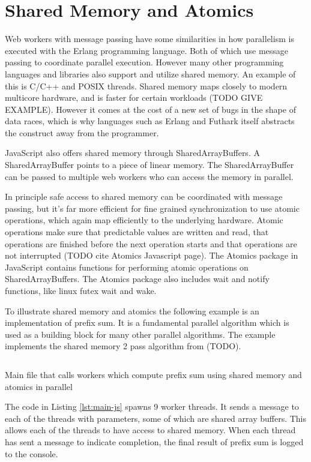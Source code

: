 \documentclass[11pt]{book}
\begin{document}
\section{Shared Memory and Atomics}

Web workers with message passing have some similarities in how parallelism is executed with the Erlang programming language. Both of which use message passing to coordinate parallel execution. However many other programming languages and libraries also support and utilize shared memory. An example of this is C/C++ and POSIX threads. Shared memory maps closely to modern multicore hardware, and is faster for certain workloads (TODO GIVE EXAMPLE). However it comes at the cost of a new set of bugs in the shape of data races, which is why languages such as Erlang and Futhark itself abstracts the construct away from the programmer.

JavaScript also offers shared memory through SharedArrayBuffers. A SharedArrayBuffer points to a piece of linear memory. The SharedArrayBuffer can be passed to multiple web workers who can access the memory in parallel. 

In principle safe access to shared memory can be coordinated with message passing, but it's far more efficient for fine grained synchronization to use atomic operations, which again map efficiently to the underlying hardware. Atomic operations make sure that predictable values are written and read, that operations are finished before the next operation starts and that operations are not interrupted (TODO cite Atomics Javascript page). The Atomics package in JavaScript contains functions for performing atomic operations on SharedArrayBuffers. The Atomics package also includes wait and notify functions, like linux futex wait and wake.

To illustrate shared memory and atomics the following example is an implementation of prefix sum. It is a fundamental parallel algorithm which is used as a building block for many other parallel algorithms. The example implements the shared memory 2 pass algorithm from (TODO). 
\begin{listing}[H]    
        \inputminted[fontsize=\small,baselinestretch=0.5,linenos]{javascript}{code/shared/main.js}
        \caption{Main file that calls workers which compute prefix sum using shared memory and atomics in parallel}    
        \label{lst:main-js}    
\end{listing}    
The code in Listing \ref{lst:main-js} spawns 9 worker threads. It sends a message to each of the threads with parameters, some of which are shared array buffers. This allows each of the threads to have access to shared memory. When each thread has sent a message to indicate completion, the final result of prefix sum is logged to the console.
\end{document}

